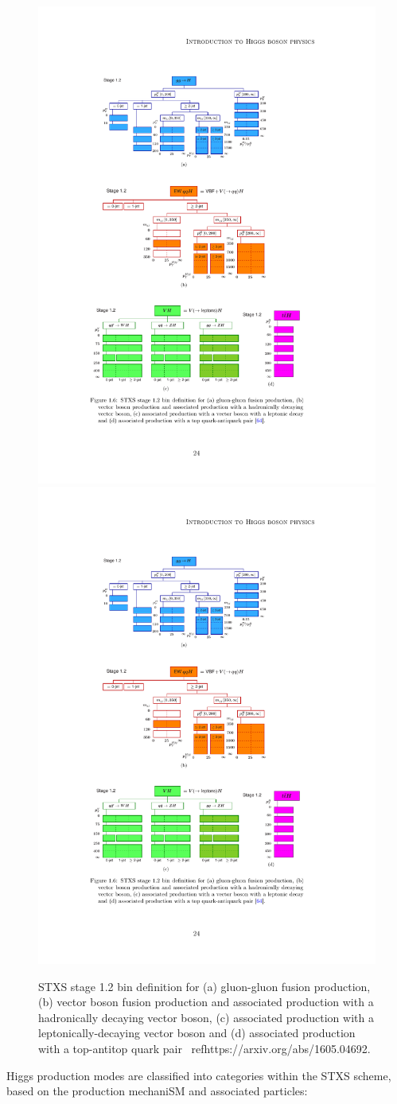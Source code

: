 \documentclass[11pt,twoside]{book}
\begin{document}
\begin{figure}[htbp]
    \includegraphics[width=0.7\linewidth]{images/STXSbins_VlepH}\\
    \includegraphics[width=0.3\linewidth]{images/STXSbins_ttH}\\
    \caption{STXS stage 1.2 bin definition for (a) gluon-gluon fusion production, (b) vector boson fusion production and associated production with a hadronically decaying vector boson, (c) associated production with a leptonically-decaying vector boson and (d) associated production with a top-antitop quark pair ~ref{https://arxiv.org/abs/1605.04692}.}
    \label{fig:STXSbins}
\end{figure}


Higgs production modes are classified into categories within the STXS scheme, based on the production mechani\acrshort{SM} and associated particles:
\end{document}
